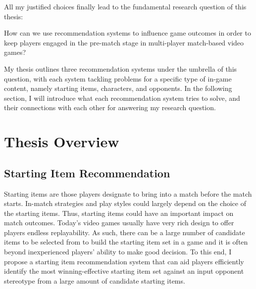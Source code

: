 All my justified choices finally lead to the fundamental research question of this thesis:

\begin{displayquote}
How can we use recommendation systems to influence game outcomes in order to keep players engaged in the pre-match stage in multi-player match-based video games?
\end{displayquote}


My thesis outlines three recommendation systems under the umbrella of this question, with each system tackling problems for a specific type of in-game content, namely starting items, characters, and opponents. In the following section, I will introduce what each recommendation system tries to solve, and their connections with each other for answering my research question.

\section{Thesis Overview}

\subsection{Starting Item Recommendation}

Starting items are those players designate to bring into a match before the match starts. In-match strategies and play styles could largely depend on the choice of the starting items. Thus, starting items could have an important impact on match outcomes. Today's video games usually have very rich design to offer players endless replayability. As such, there can be a large number of candidate items to be selected from to build the starting item set in a game and it is often beyond inexperienced players' ability to make good decision. To this end, I propose a starting item recommendation system that can aid players efficiently identify the most winning-effective starting item set against an input opponent stereotype from a large amount of candidate starting items. 

